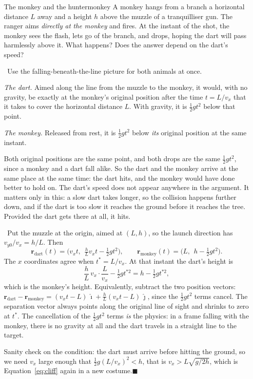 \documentclass[11pt,twoside,openany]{book}
\newcounter{check}[chapter]
\newcommand{\viewtag}[3]{\fcolorbox{#2}{#3}{\footnotesize\textbf{\textcolor{#2}{#1}}}}
\newcommand{\elemtag}{\viewtag{Elementary}{elemcol}{elempale}}
\newcommand{\calctag}{\viewtag{Calculus}{calccol}{calcpale}}
\newcommand{\elem}{\par\medskip\noindent\elemtag\ }
\newcommand{\calc}{\par\medskip\noindent\calctag\ }
\newcommand{\qed}{\hfill$\blacksquare$}
\begin{document}
\begin{example}{The monkey and the hunter}{monkey}
A monkey hangs from a branch a horizontal distance $L$ away and a height $h$ above the muzzle of a tranquilliser gun. The ranger aims \emph{directly at the monkey} and fires. At the instant of the shot, the monkey sees the flash, lets go of the branch, and drops, hoping the dart will pass harmlessly above it. What happens? Does the answer depend on the dart's speed?

\elem Use the falling-beneath-the-line picture for both animals at once.

\emph{The dart.} Aimed along the line from the muzzle to the monkey, it would, with no gravity, be exactly at the monkey's original position after the time $t = L/v_x$ that it takes to cover the horizontal distance $L$. With gravity, it is $\tfrac12 g t^2$ below that point.

\emph{The monkey.} Released from rest, it is $\tfrac12 g t^2$ below \emph{its} original position at the same instant.

Both original positions are the same point, and both drops are the same $\tfrac12 g t^2$, since a monkey and a dart fall alike. So the dart and the monkey arrive at the same place at the same time: the dart hits, and the monkey would have done better to hold on. The dart's speed does not appear anywhere in the argument. It matters only in this: a slow dart takes longer, so the collision happens further down, and if the dart is too slow it reaches the ground before it reaches the tree. Provided the dart gets there at all, it hits.

\calc Put the muzzle at the origin, aimed at $(L, h)$, so the launch direction has $v_{y0}/v_x = h/L$. Then
\[
\mathbf{r}_{\text{dart}}(t) = \big(v_x t,\ \ \tfrac{h}{L}v_x t - \tfrac12 g t^2\big),
\qquad
\mathbf{r}_{\text{monkey}}(t) = \big(L,\ \ h - \tfrac12 g t^2\big).
\]
The $x$ coordinates agree when $t^\ast = L/v_x$. At that instant the dart's height is
\[
\frac{h}{L}\,v_x \cdot \frac{L}{v_x} - \tfrac12 g t^{\ast 2} = h - \tfrac12 g t^{\ast 2},
\]
which is the monkey's height. Equivalently, subtract the two position vectors: $\mathbf{r}_{\text{dart}} - \mathbf{r}_{\text{monkey}} = (v_xt - L)\,\hat{\mathbf{\imath}} + \tfrac{h}{L}(v_x t - L)\,\hat{\mathbf{\jmath}}$, since the $\tfrac12 gt^2$ terms cancel. The separation vector always points along the original line of sight and shrinks to zero at $t^\ast$. The cancellation of the $\tfrac12 g t^2$ terms \emph{is} the physics: in a frame falling with the monkey, there is no gravity at all and the dart travels in a straight line to the target.

Sanity check on the condition: the dart must arrive before hitting the ground, so we need $v_x$ large enough that $\tfrac12 g (L/v_x)^2 < h$, that is $v_x > L\sqrt{g/2h}$, which is Equation~\eqref{eq:cliff} again in a new costume.\qed
\end{example}
\end{document}
